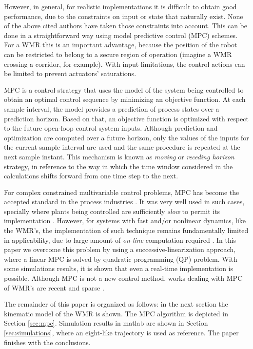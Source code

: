 \documentclass[twocolumn]{IEEEtran} %
\begin{document}
However, in general, for realistic implementations it is difficult to obtain good performance, due to the constraints on input or state that naturally exist. None of the above cited authors have taken those constraints into account. This can be done in a straightforward way using model predictive control (MPC) schemes. For a WMR this is an important advantage, because the position of the robot can be restricted to belong to a secure region of operation (imagine a WMR crossing a corridor, for example). With input limitations, the control actions can be limited to prevent actuators' saturations.

MPC is a control strategy that uses the model of the system being controlled to obtain an optimal control sequence by minimizing an objective function. At each sample interval, the model provides a prediction of process states over a prediction horizon. Based on that, an objective function is optimized with respect to the future open-loop control system inputs. Although prediction and optimization are computed over a future horizon, only the values of the inputs for the current sample interval are used and the same procedure is repeated at the next sample instant. This mechanism is known as {\it moving} or {\it receding horizon} strategy, in reference to the way in which the time window considered in the calculations shifts forward from one time step to the next.

For complex constrained multivariable control problems, MPC has become the accepted standard in the process industries \cite{bemporad02}. It was very well used in such cases, specially where plants being controlled are sufficiently {\em slow} to permit its implementation \cite{mayne98}. However, for systems with fast and/or nonlinear dynamics, like the WMR's, the implementation of such technique remains fundamentally limited in applicability, due to large amount of {\em on-line} computation required \cite{cannon00}. In this paper we overcome this problem by using a successive-linearization approach, where a linear MPC is solved by quadratic programming (QP) problem. With some simulations results, it is shown that even a real-time implementation is possible. Although MPC is not a new control method, works dealing with MPC of WMR's are recent and sparse \cite{ollero91,rico99,essen01}.

The remainder of this paper is organized as follows: in the next section the kinematic model of the WMR is shown. The MPC algorithm is depicted in Section \ref{sec:mpc}. Simulation results in {\sc matlab} are shown in Section \ref{sec:simulations}, where an eight-like trajectory is used as reference. The paper finishes with the conclusions. 
\end{document}
